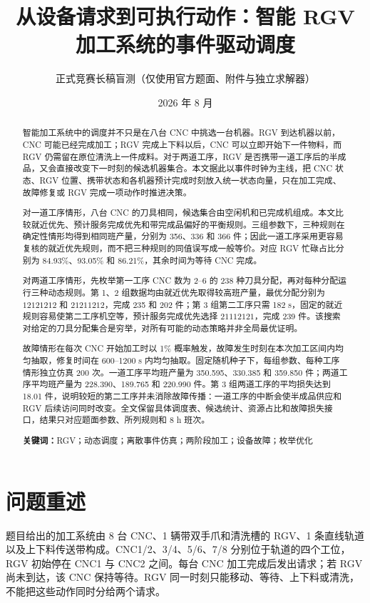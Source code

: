 \documentclass[UTF8,11pt,a4paper]{ctexart}
\title{从设备请求到可执行动作：智能 RGV 加工系统的事件驱动调度}
\author{正式竞赛长稿盲测（仅使用官方题面、附件与独立求解器）}
\date{2026 年 8 月}
\newcommand{\keywords}[1]{\par\noindent\textbf{关键词：}#1}
\begin{document}
\maketitle

\begin{abstract}
智能加工系统中的调度并不只是在八台 CNC 中挑选一台机器。RGV 到达机器以前，CNC 可能已经完成加工；RGV 完成上下料以后，CNC 可以立即开始下一件物料，而 RGV 仍需留在原位清洗上一件成料。对于两道工序，RGV 是否携带一道工序后的半成品，又会直接改变下一时刻的候选机器集合。本文据此以事件时钟为主线，把 CNC 状态、RGV 位置、携带状态和各机器预计完成时刻放入统一状态向量，只在加工完成、故障修复或 RGV 完成一项动作时推进决策。

对一道工序情形，八台 CNC 的刀具相同，候选集合由空闲机和已完成机组成。本文比较就近优先、预计服务完成优先和带完成品偏好的平衡规则。三组参数下，三种规则在确定性情形均得到相同班产量，分别为 356、336 和 366 件；因此一道工序采用更容易复核的就近优先规则，而不把三种规则的同值误写成一般等价。对应 RGV 忙碌占比分别为 84.93\%、93.05\% 和 86.21\%，其余时间为等待 CNC 完成。

对两道工序情形，先枚举第一工序 CNC 数为 2--6 的 238 种刀具分配，再对每种分配运行三种动态规则。第 1、2 组数据均由就近优先取得较高班产量，最优分配分别为 $12121212$ 和 $21211212$，完成 235 和 202 件；第 3 组第二工序只需 182 s，固定的就近规则容易使第二工序机空等，预计服务完成优先选择 $21112121$，完成 239 件。该搜索对给定的刀具分配集合是穷举，对所有可能的动态策略并非全局最优证明。

故障情形在每次 CNC 开始加工时以 1\% 概率触发，故障发生时刻在本次加工区间内均匀抽取，修复时间在 600--1200 s 内均匀抽取。固定随机种子下，每组参数、每种工序情形独立仿真 200 次。一道工序平均班产量为 350.595、330.385 和 359.850 件；两道工序平均班产量为 228.390、189.765 和 220.990 件。第 3 组两道工序的平均损失达到 18.01 件，说明较短的第二工序并未消除故障传播：一道工序的中断会使半成品供应和 RGV 后续访问同时改变。全文保留具体调度表、候选统计、资源占比和故障损失接口，结果只对应题面参数、所列规则和 8 h 班次。

\keywords{RGV；动态调度；离散事件仿真；两阶段加工；设备故障；枚举优化}
\end{abstract}

\label{mcm-body-start}
\section{问题重述}

题目给出的加工系统由 8 台 CNC、1 辆带双手爪和清洗槽的 RGV、1 条直线轨道以及上下料传送带构成。CNC1/2、3/4、5/6、7/8 分别位于轨道的四个工位，RGV 初始停在 CNC1 与 CNC2 之间。每台 CNC 加工完成后发出请求；若 RGV 尚未到达，该 CNC 保持等待。RGV 同一时刻只能移动、等待、上下料或清洗，不能把这些动作同时分给两个请求。
\end{document}
